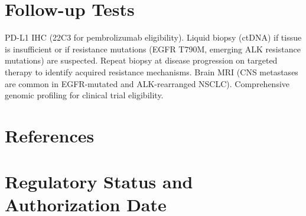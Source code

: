 \section*{Follow-up Tests}
PD-L1 IHC (22C3 for pembrolizumab eligibility). Liquid biopsy (ctDNA) if tissue is insufficient or if resistance mutations (EGFR T790M, emerging ALK resistance mutations) are suspected. Repeat biopsy at disease progression on targeted therapy to identify acquired resistance mechanisms. Brain MRI (CNS metastases are common in EGFR-mutated and ALK-rearranged NSCLC). Comprehensive genomic profiling for clinical trial eligibility.

\section*{References}



\clearpage
\section*{Regulatory Status and Authorization Date}

\clearpage
